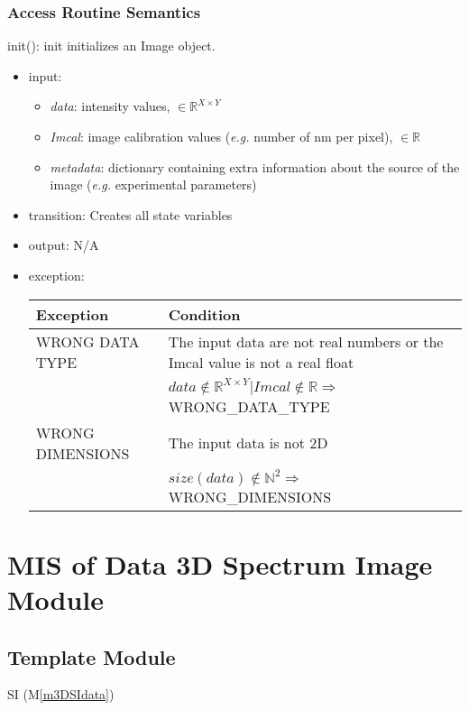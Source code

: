 \documentclass[12pt, titlepage]{article}
\newcommand{\mref}[1]{M\ref{#1}}
\begin{document}
\subsubsection{Access Routine Semantics}

\noindent init():
init initializes an Image object.
\begin{itemize}
    \item input:
    \begin{itemize}
        \item \textit{data}: intensity values, $\in \mathbb{R}^{X \times Y}$
        \item \textit{Imcal}: image calibration values (\textit{e.g.} number of
        \si{\nano\metre} per pixel), $\in \mathbb{R}$
        \item \textit{metadata}: dictionary containing extra information about
        the source of the image (\textit{e.g.} experimental parameters)
    \end{itemize}
    \item transition: Creates all state variables
    \item output: N/A
    \item exception:
    \begin{center}
        \begin{tabular}{p{4cm} p{11.5cm}}
            \toprule[0.15em]
            \textbf{Exception} & \textbf{Condition}\\
            \midrule[0.1em]
            WRONG DATA TYPE & The input data are not real numbers or the Imcal
            value is not a real float\\
            & $data \notin \mathbb{R}^{X \times Y}  | Imcal \notin \mathbb{R}
            \Rightarrow$ WRONG\_DATA\_TYPE \\ 
            \midrule[0.05em]
            WRONG DIMENSIONS & The input data is not 2D\\
            & $size(data) \notin \mathbb{N}^2 \Rightarrow $ WRONG\_DIMENSIONS\\
            \bottomrule[0.15em]
        \end{tabular}
    \end{center}
\end{itemize}

\section{MIS of Data 3D Spectrum Image Module} \label{Mod:SI}

\subsection{Template Module}
SI (\mref{m3DSIdata})
\end{document}

